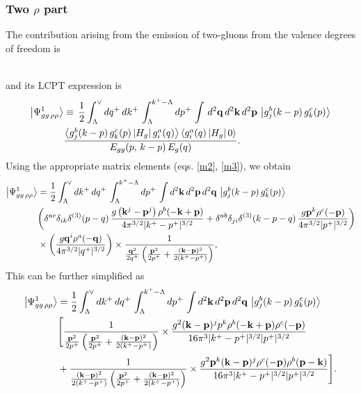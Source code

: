 \documentclass[a4paper,11pt]{article}
\def\v#1{\mathbf{#1}}
\begin{document}
\subsubsection*{Two $\rho$ part}
The contribution arising from the emission of two-gluons from the valence degrees of freedom is
\pagebreak
\begin{figure}[htbp]
\centering
\end{figure}\\
and its LCPT expression is 
\begin{align}
\left|\Psi_{gg\,\rho\rho}^{1}\right\rangle &\equiv\,\frac{1}{2}\int_{\Lambda}^{\vee}dq^{+}\, dk^{+}\,\int_{\Lambda}^{k^{+}-\Lambda}dp^{+}\,\int\, d^{2}\mathbf{q}\, d^{2}\mathbf{k}\, d^{2}\mathbf{p}\,\left|g_{j}^{b}(k-p)\, g_{k}^{c}(p)\right\rangle \notag \\ & \frac{\left\langle g_{j}^{b}(k-p)\, g_{k}^{c}(p)\left|H_{g}\right|g_{i}^{a}(q)\right\rangle \left\langle g_{i}^{a}(q)\left|H_{g}\right|0\right\rangle }{E_{gg}(p,\, k-p)\, E_{g}(q)}.
\end{align}
Using the appropriate matrix elements (eqs. \eqref{m2}, \eqref{m3}), we obtain
\begin{align}\label{ggrhorho1a}
\left|\Psi_{gg\,\rho\rho}^{1}\right\rangle & = \frac{1}{2}\int_{\Lambda}^{\vee}dk^{+}\, dq^{+}\,\int_{\Lambda}^{k^{+}-\Lambda}dp^{+}\,\int d^{2}\mathbf{k}\, d^{2}\mathbf{p}\, d^{2}\mathbf{q}\,\left|g_{j}^{b}(k-p)\, g_{k}^{c}(p)\right\rangle \notag \\ & \bigg(\delta^{ac}\delta_{ik}\delta^{(3)}(p-q)\, \frac{g\left(\mathbf{k}^{j}-\mathbf{p}^{j}\right)\rho^{b}(-\mathbf{k} +\mathbf{p})}{4\pi^{3/2}|k^{+}-p^{+}|^{3/2}} +\delta^{ab}\delta_{ji}\delta^{(3)}(k-p-q)\,\frac{g\mathbf{p}^{k}\rho^{c}(-\mathbf{p})}{4\pi^{3/2}|p^{+}|^{3/2}}\bigg)\notag \\ &  \times \left(\frac{g\mathbf{q}^{i}\rho^{a}(-\mathbf{q})}{4\pi^{3/2}|q^{+}|^{3/2}}\right)\times \frac{1}{\frac{\mathbf{q}^{2}}{2q^{+}}\left(\frac{\mathbf{p}^{2}}{2p^{+}}+\frac{(\mathbf{k}-\mathbf{p})^{2}}{2(k^{+}-p^{+})}\right)},
\end{align} 
This can be further simplified as
\begin{align}\label{ggrhorho1}
\left|\Psi_{gg\,\rho\rho}^{1}\right\rangle & = \frac{1}{2}\int_{\Lambda}^{\vee}dk^{+}\, dq^{+}\,\int_{\Lambda}^{k^{+}-\Lambda}dp^{+}\,\int d^{2}\mathbf{k}\, d^{2}\mathbf{p}\, d^{2}\mathbf{q}\,\left|g_{j}^{b}(k-p)\, g_{k}^{c}(p)\right\rangle\,\notag \\ &  \Bigg[\frac{1}{\frac{\mathbf{p}^{2}}{2p^{+}}\left(\frac{\mathbf{p}^{2}}{2p^{+}}+\frac{(\mathbf{k}-\mathbf{p})^{2}}{2(k^{+}-p^{+})}\right)} \times \frac{g^{2}(\v{k-p})^{j}p^{k}\rho^{b}(\v{-k+p})\rho^{c}(\v{-p})}{16\pi^{3}|k^{+}-p^{+}|^{3/2}|p^{+}|^{3/2}}\notag \\ & +\frac{1}{\frac{\mathbf{(k-p)}^{2}}{2(k^{+}-p^{+})}\left(\frac{\mathbf{p}^{2}}{2p^{+}}+\frac{(\mathbf{k}-\mathbf{p})^{2}}{2(k^{+}-p^{+})}\right)}\times\frac{g^{2}\v{p}^{k}(\v{k-p})^{j}\rho^{c}(\v{-p})\rho^{b}(\v{p-k})}{16\pi^{3}|k^{+}-p^{+}|^{3/2}|p^{+}|^{3/2}} \Bigg].
\end{align} 
\end{document}
